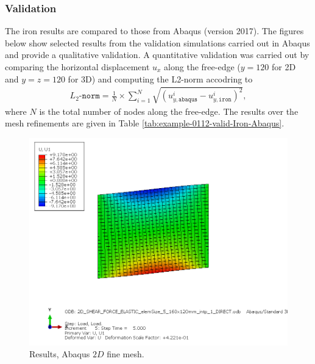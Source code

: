 \subsubsection{Validation}
%


%
The iron results are compared to those from Abaqus (version 2017). The figures below show selected results from the validation simulations carried out in Abaqus and provide a qualitative validation. A quantitative validation was carried out by comparing the horizontal displacement $u_x$ along the free-edge ($y=120$ for 2D and $y=z=120$ for 3D) and computing the L2-norm accodring to
\begin{align}
    L_2\texttt{-norm} = \frac{1}{N} \times \sum_{i=1}^{N} \sqrt{\left(u_{y,\texttt{abaqus}}^i-u_{y,\texttt{iron}}^i  \right)^2},
\end{align}
where $N$ is the total number of nodes along the free-edge. The results over the mesh refinements are given in Table \ref{tab:example-0112-valid-Iron-Abaqus}.
%
\begin{figure}[h!]
    \centering 
    \includegraphics[width=\columnwidth]{examples/example-0112/doc/figures/2D_SHEAR_FORCE_ELASTIC_elemSize_5_160x120mm_intp_1_DIRECTU1.png} 
    \caption{Results, Abaqus $2D$ fine mesh.}
    \label{example-0112-abaqus-2D-fig}
\end{figure}
%
